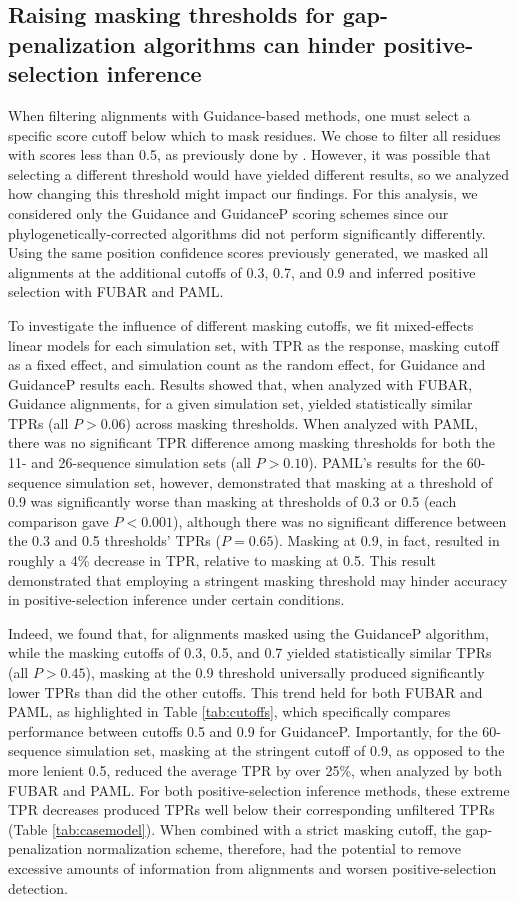 \documentclass[11pt]{article}
\begin{document}
\subsection*{Raising masking thresholds for gap-penalization algorithms can hinder positive-selection inference}

When filtering alignments with Guidance-based methods, one must select a specific score cutoff below which to mask residues. We chose to filter all residues with scores less than 0.5, as previously done by \citet{Jordan2012}. However, it was possible that selecting a different threshold would have yielded different results, so we analyzed how changing this threshold might impact our findings. For this analysis, we considered only the Guidance and GuidanceP scoring schemes since our phylogenetically-corrected algorithms did not perform significantly differently. Using the same position confidence scores previously generated, we masked all alignments at the additional cutoffs of 0.3, 0.7, and 0.9 and inferred positive selection with FUBAR and PAML.

To investigate the influence of different masking cutoffs, we fit mixed-effects linear models for each simulation set, with TPR as the response, masking cutoff as a fixed effect, and simulation count as the random effect, for Guidance and GuidanceP results each. 
Results showed that, when analyzed with FUBAR, Guidance alignments, for a given simulation set, yielded statistically similar TPRs (all $P>0.06$) across masking thresholds. When analyzed with PAML, there was no significant TPR difference among masking thresholds for both the 11- and 26-sequence simulation sets (all $P>0.10$). PAML's results for the 60-sequence simulation set, however, demonstrated that masking at a threshold of 0.9 was significantly worse than masking at thresholds of 0.3 or 0.5 (each comparison gave $P<0.001$), although there was no significant difference between the 0.3 and 0.5 thresholds' TPRs ($P=0.65$). Masking at 0.9, in fact, resulted in roughly a 4\% decrease in TPR, relative to masking at 0.5. This result demonstrated that employing a stringent masking threshold may hinder accuracy in positive-selection inference under certain conditions.

Indeed, we found that, for alignments masked using the GuidanceP algorithm, while the masking cutoffs of 0.3, 0.5, and 0.7 yielded statistically similar TPRs (all $P>0.45$), masking at the 0.9 threshold universally produced significantly lower TPRs than did the other cutoffs. This trend held for both FUBAR and PAML, as highlighted in Table \ref{tab:cutoffs}, which specifically compares performance between cutoffs 0.5 and 0.9 for GuidanceP. Importantly, for the 60-sequence simulation set, masking at the stringent cutoff of 0.9, as opposed to the more lenient 0.5, reduced the average TPR by over 25\%, when analyzed by both FUBAR and PAML. For both positive-selection inference methods, these extreme TPR decreases produced TPRs well below their corresponding unfiltered TPRs (Table \ref{tab:casemodel}). When combined with a strict masking cutoff, the gap-penalization normalization scheme, therefore, had the potential to remove excessive amounts of information from alignments and worsen positive-selection detection. 
\end{document}
